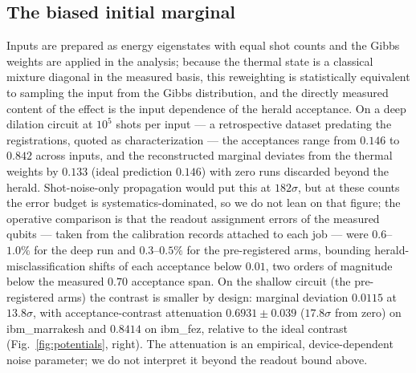 \documentclass[aps,pra,twocolumn,superscriptaddress,nofootinbib]{revtex4-2}
\begin{document}
\subsection{The biased initial marginal}
Inputs are prepared as energy eigenstates with equal shot counts and the Gibbs weights are applied in the analysis; because the thermal state is a classical mixture diagonal in the measured basis, this reweighting is statistically equivalent to sampling the input from the Gibbs distribution, and the directly measured content of the effect is the input dependence of the herald acceptance. On a deep dilation circuit at $10^5$ shots per input --- a retrospective dataset predating the registrations, quoted as characterization --- the acceptances range from $0.146$ to $0.842$ across inputs, and the reconstructed marginal deviates from the thermal weights by $0.133$ (ideal prediction $0.146$) with zero runs discarded beyond the herald. Shot-noise-only propagation would put this at $182\sigma$, but at these counts the error budget is systematics-dominated, so we do not lean on that figure; the operative comparison is that the readout assignment errors of the measured qubits --- taken from the calibration records attached to each job --- were $0.6$--$1.0\%$ for the deep run and $0.3$--$0.5\%$ for the pre-registered arms, bounding herald-misclassification shifts of each acceptance below $0.01$, two orders of magnitude below the measured $0.70$ acceptance span. On the shallow circuit (the pre-registered arms) the contrast is smaller by design: marginal deviation $0.0115$ at $13.8\sigma$, with acceptance-contrast attenuation $0.6931\pm0.039$ ($17.8\sigma$ from zero) on ibm\_marrakesh and $0.8414$ on ibm\_fez, relative to the ideal contrast (Fig.~\ref{fig:potentials}, right). The attenuation is an empirical, device-dependent noise parameter; we do not interpret it beyond the readout bound above.
\end{document}
